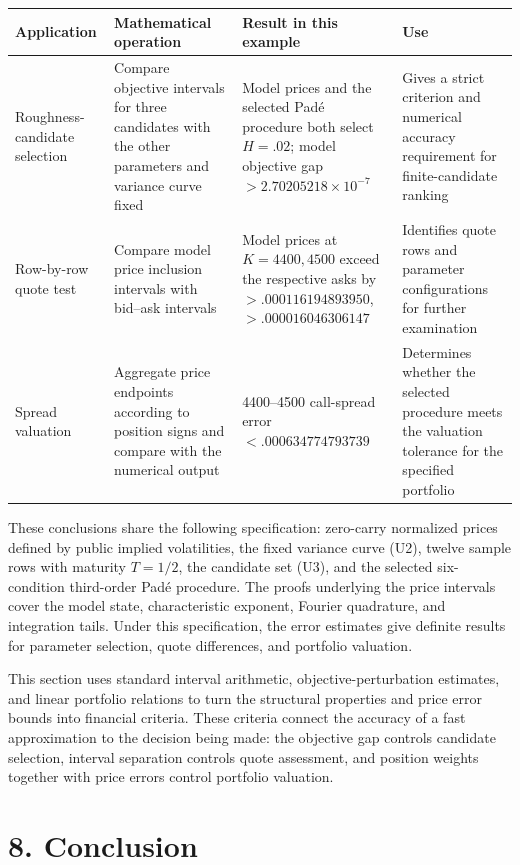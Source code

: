 \documentclass[a4paper,11pt]{article}
\begin{document}
\begingroup\scriptsize\setlength{\tabcolsep}{3pt}
\begin{longtable}{L{0.222500\textwidth}L{0.222500\textwidth}L{0.222500\textwidth}L{0.222500\textwidth}}
Application & Mathematical operation & Result in this example & Use\\
\hline
Roughness-candidate selection & Compare objective intervals for three candidates with the other parameters and variance curve fixed & Model prices and the selected Padé procedure both select $H=.02$; model objective gap $>2.70205218\times10^{-7}$ & Gives a strict criterion and numerical accuracy requirement for finite-candidate ranking\\
Row-by-row quote test & Compare model price inclusion intervals with bid–ask intervals & Model prices at $K=4400,4500$ exceed the respective asks by $>.000116194893950$, $>.000016046306147$ & Identifies quote rows and parameter configurations for further examination\\
Spread valuation & Aggregate price endpoints according to position signs and compare with the numerical output & 4400–4500 call-spread error $<.000634774793739$ & Determines whether the selected procedure meets the valuation tolerance for the specified portfolio\\
\end{longtable}\endgroup

These conclusions share the following specification: zero-carry normalized prices defined by public implied volatilities, the fixed variance curve (U2), twelve sample rows with maturity $T=1/2$, the candidate set (U3), and the selected six-condition third-order Padé procedure. The proofs underlying the price intervals cover the model state, characteristic exponent, Fourier quadrature, and integration tails. Under this specification, the error estimates give definite results for parameter selection, quote differences, and portfolio valuation.

This section uses standard interval arithmetic, objective-perturbation estimates, and linear portfolio relations to turn the structural properties and price error bounds into financial criteria. These criteria connect the accuracy of a fast approximation to the decision being made: the objective gap controls candidate selection, interval separation controls quote assessment, and position weights together with price errors control portfolio valuation.

\section*{8. Conclusion}
\end{document}
